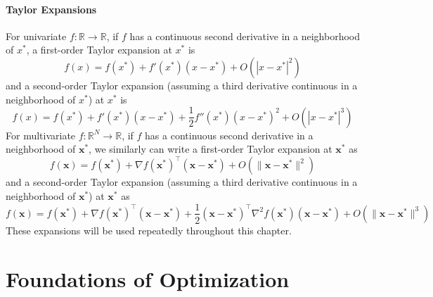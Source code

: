 \paragraph*{Taylor Expansions}
For univariate $f: \mathbb{R} \to \mathbb{R}$, if $f$ has a continuous second derivative in a neighborhood of $x^*$, a first-order Taylor expansion at $x^*$ is
\begin{equation}
    f(x) = f(x^*) + f'(x^*)(x-x^*) + O(|x-x^*|^2)
\end{equation}
and a second-order Taylor expansion (assuming a third derivative continuous in a neighborhood of $x^*$) at $x^*$ is
\begin{equation}
    f(x) = f(x^*) + f'(x^*)(x-x^*) + \frac{1}{2} f''(x^*)(x-x^*)^2 + O(|x-x^*|^3)
\end{equation}
For multivariate $f: \mathbb{R}^N \to \mathbb{R}$, if $f$ has a continuous second derivative in a neighborhood of $\mathbf{x}^*$, we similarly can write a first-order Taylor expansion at $\mathbf{x}^*$ as
\begin{equation}
    f(\mathbf{x}) = f(\mathbf{x}^*) + \nabla f(\mathbf{x}^*)^\top(\mathbf{x}-\mathbf{x}^*) + O(\|\mathbf{x}-\mathbf{x}^*\|^2)
\end{equation}
and a second-order Taylor expansion (assuming a third derivative continuous in a neighborhood of $\mathbf{x}^*$) at $\mathbf{x}^*$ as
\begin{equation}
    f(\mathbf{x}) = f(\mathbf{x}^*) + \nabla f(\mathbf{x}^*)^\top(\mathbf{x}-\mathbf{x}^*) + \frac{1}{2} (\mathbf{x}-\mathbf{x}^*)^\top \nabla^2 f(\mathbf{x}^*) (\mathbf{x}-\mathbf{x}^*) + O(\|\mathbf{x}-\mathbf{x}^*\|^3)
\end{equation}
These expansions will be used repeatedly throughout this chapter.

\section{Foundations of Optimization}

